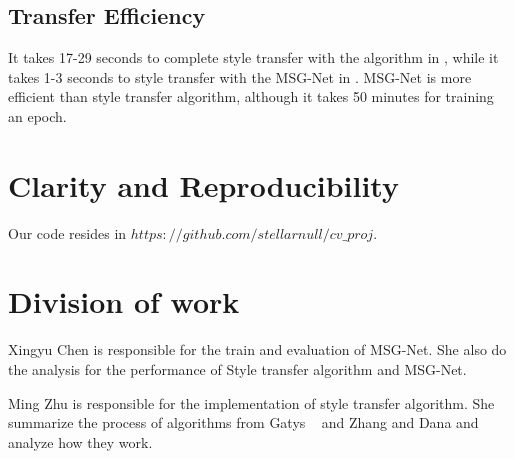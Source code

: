 \documentclass[10pt,twocolumn,letterpaper]{article}
\begin{document}
\subsection{Transfer Efficiency}
It takes 17-29 seconds to complete style transfer with the algorithm in \cite{Authors01}, while it takes 1-3 seconds to style transfer with the MSG-Net in \cite{Authors04}. MSG-Net is more efficient than style transfer algorithm, although it takes 50 minutes for training an epoch.


\section{Clarity and Reproducibility}
Our code resides in \newline $https://github.com/stellarnull/cv\_proj$.


\section{Division of work}
Xingyu Chen is responsible for the train and evaluation of MSG-Net. She also do the analysis for the performance of Style transfer algorithm and MSG-Net.

Ming Zhu is responsible for the implementation of style transfer algorithm. She summarize the process of algorithms from Gatys \etal~\cite{Authors01} and Zhang and Dana \cite{Authors04} and analyze how they work.

{\small


}
\end{document}

